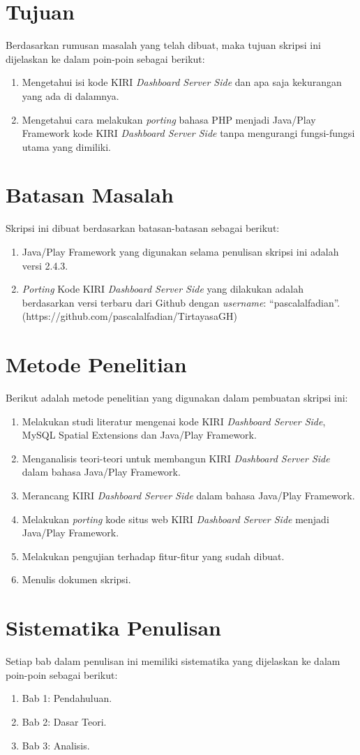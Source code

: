 \section{Tujuan}
\label{sec:tujuan}
Berdasarkan rumusan masalah yang telah dibuat, maka tujuan skripsi ini dijelaskan ke dalam poin-poin sebagai berikut:
	\begin{enumerate}
		\item Mengetahui isi kode KIRI \textit{Dashboard Server Side} dan apa saja kekurangan yang ada di dalamnya.
		\item Mengetahui cara melakukan \textit{porting} bahasa PHP menjadi Java/Play Framework kode KIRI \textit{Dashboard Server Side} tanpa mengurangi fungsi-fungsi utama yang dimiliki.
	\end{enumerate}
	
\section{Batasan Masalah}
\label{sec:batasan_masalah}
Skripsi ini dibuat berdasarkan batasan-batasan sebagai berikut:
	\begin{enumerate}
		\item Java/Play Framework yang digunakan selama penulisan skripsi ini adalah versi 2.4.3.
		\item \textit{Porting} Kode KIRI \textit{Dashboard Server Side} yang dilakukan adalah berdasarkan versi terbaru dari Github dengan \textit{username}: ``pascalalfadian''. (https://github.com/pascalalfadian/TirtayasaGH)
	\end{enumerate}
	
\section{Metode Penelitian}
\label{sec:metode_penelitian}
Berikut adalah metode penelitian yang digunakan dalam pembuatan skripsi ini:
	\begin{enumerate}
		\item Melakukan studi literatur mengenai kode KIRI \textit{Dashboard Server Side}, MySQL Spatial Extensions dan Java/Play Framework.
		\item Menganalisis teori-teori untuk membangun KIRI \textit{Dashboard Server Side} dalam bahasa Java/Play Framework.
		\item Merancang KIRI \textit{Dashboard Server Side} dalam bahasa Java/Play Framework.
		\item Melakukan \textit{porting} kode situs web KIRI \textit{Dashboard Server Side} menjadi Java/Play Framework.
		\item Melakukan pengujian terhadap fitur-fitur yang sudah dibuat.
		\item Menulis dokumen skripsi.
	\end{enumerate}

\section{Sistematika Penulisan}
\label{sec:sistematika_penulisan}
Setiap bab dalam penulisan ini memiliki sistematika yang dijelaskan ke dalam poin-poin sebagai berikut:
	\begin{enumerate}
		\item Bab 1: Pendahuluan. 
		\item Bab 2: Dasar Teori.
		\item Bab 3: Analisis.
	\end{enumerate}